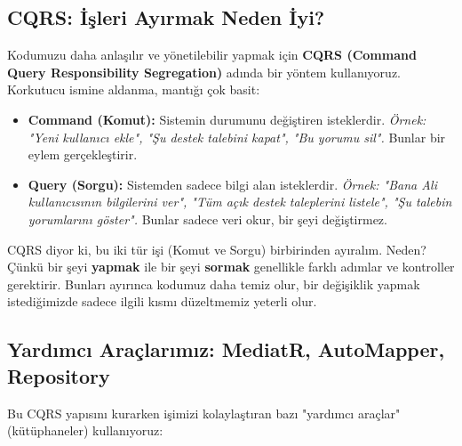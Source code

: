 \documentclass[11pt, a4paper]{article}
\begin{document}
\subsection{CQRS: İşleri Ayırmak Neden İyi?}

Kodumuzu daha anlaşılır ve yönetilebilir yapmak için \textbf{CQRS (Command Query Responsibility Segregation)} adında bir yöntem kullanıyoruz. Korkutucu ismine aldanma, mantığı çok basit:

\begin{itemize}
    \item \textbf{Command (Komut):} Sistemin durumunu değiştiren isteklerdir. \emph{Örnek: "Yeni kullanıcı ekle", "Şu destek talebini kapat", "Bu yorumu sil".} Bunlar bir eylem gerçekleştirir.
    \item \textbf{Query (Sorgu):} Sistemden sadece bilgi alan isteklerdir. \emph{Örnek: "Bana Ali kullanıcısının bilgilerini ver", "Tüm açık destek taleplerini listele", "Şu talebin yorumlarını göster".} Bunlar sadece veri okur, bir şeyi değiştirmez.
\end{itemize}
CQRS diyor ki, bu iki tür işi (Komut ve Sorgu) birbirinden ayıralım. Neden? Çünkü bir şeyi \textbf{yapmak} ile bir şeyi \textbf{sormak} genellikle farklı adımlar ve kontroller gerektirir. Bunları ayırınca kodumuz daha temiz olur, bir değişiklik yapmak istediğimizde sadece ilgili kısmı düzeltmemiz yeterli olur.

\subsection{Yardımcı Araçlarımız: MediatR, AutoMapper, Repository}

Bu CQRS yapısını kurarken işimizi kolaylaştıran bazı "yardımcı araçlar" (kütüphaneler) kullanıyoruz:
\end{document}
